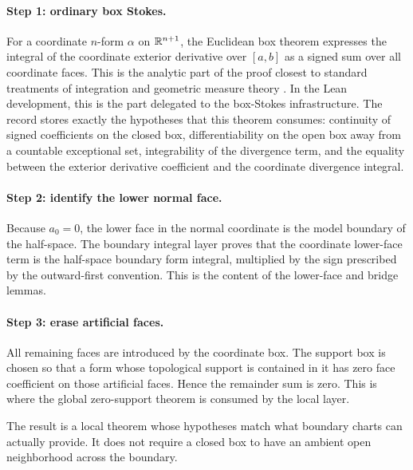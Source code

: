 \paragraph{Step 1: ordinary box Stokes.}
For a coordinate \(n\)-form \(\alpha\) on \(\mathbb{R}^{n+1}\), the Euclidean box
theorem expresses the integral of the coordinate exterior derivative over
\([a,b]\) as a signed sum over all coordinate faces.  This is the analytic
part of the proof closest to standard treatments of integration and geometric
measure theory
\cite{munkres1991analysis,rudin1987real,federer1969geometric,evans1992measure}.
In the Lean development, this is the part delegated to the box-Stokes infrastructure.  The
 record stores exactly the hypotheses
that this theorem consumes: continuity of signed coefficients on the closed
box, differentiability on the open box away from a countable exceptional set,
integrability of the divergence term, and the equality between the exterior
derivative coefficient and the coordinate divergence integral.

\paragraph{Step 2: identify the lower normal face.}
Because \(a_0=0\), the lower face in the normal coordinate is the model
boundary of the half-space.  The boundary integral layer proves that the
coordinate lower-face term is the half-space boundary form integral, multiplied
by the sign prescribed by the outward-first convention.  This is the content
of the lower-face and  bridge lemmas.

\paragraph{Step 3: erase artificial faces.}
All remaining faces are introduced by the coordinate box.  The support box is
chosen so that a form whose topological support is contained in it has zero
face coefficient on those artificial faces.  Hence the remainder sum is zero.
This is where the global zero-support theorem is consumed by the local layer.

The result is a local theorem whose hypotheses match what boundary charts can
actually provide.  It does not require a closed box to have an ambient open
neighborhood across the boundary.

